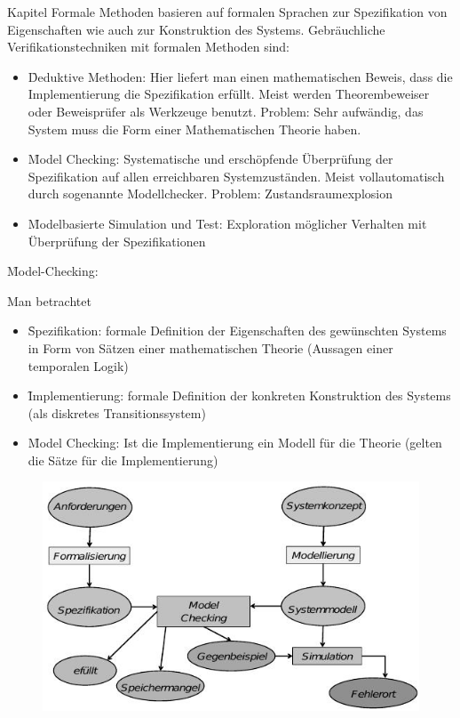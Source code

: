 \begin{chapter}{Kapitel}
\noindent Formale Methoden basieren auf formalen Sprachen zur Spezifikation von Eigenschaften wie auch zur Konstruktion des Systems. Gebräuchliche 
Verifikationstechniken mit formalen Methoden sind:
\begin{itemize}
 \item \f{Deduktive Methoden}: Hier liefert man einen mathematischen Beweis, dass die Implementierung die Spezifikation erfüllt. Meist werden Theorembeweiser 
 oder Beweisprüfer als Werkzeuge benutzt. Problem: Sehr aufwändig, das System muss die Form einer Mathematischen Theorie haben.
 \item \f{Model Checking}: Systematische und erschöpfende Überprüfung der Spezifikation auf allen erreichbaren Systemzuständen. Meist vollautomatisch durch 
 sogenannte Modellchecker. Problem: Zustandsraumexplosion
 \item \f{Modelbasierte Simulation und Test}: Exploration möglicher Verhalten mit Überprüfung der Spezifikationen
\end{itemize}

\f{Model-Checking}:
\vspace*{4pt}

\noindent Man betrachtet 
\begin{itemize}
 \item \f{Spezifikation}: formale Definition der Eigenschaften des gewünschten Systems in Form von Sätzen einer mathematischen Theorie (Aussagen einer temporalen 
 Logik)
 \item \f{Implementierung}: formale Definition der konkreten Konstruktion des Systems (als diskretes Transitionssystem)
 \item \f{Model Checking}: Ist die Implementierung ein Modell für die Theorie (gelten die Sätze für die Implementierung)
\end{itemize}
\begin{figure}[!ht]
 \centering
 \includegraphics[scale=0.8]{pics/modelchecking}
\end{figure}


\end{chapter}

